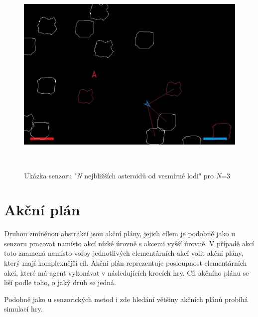 \begin{figure}[hp]

\includegraphics[width=150mm, height=100mm]{./Obrazky/N_nearest_asteroids.png}
\caption{Ukázka senzoru "\emph{N} nejbližších asteroidů od vesmírné lodi" pro \emph{N}=3}
\label{obr02:}
\end{figure}


\section{Akční plán}
Druhou zmíněnou abstrakcí jsou akční plány, jejich cílem je podobně jako u senzoru pracovat namísto akcí nízké úrovně s akcemi vyšší úrovně. V případě akcí toto znamená namísto volby jednotlivých elementárních akcí volit akční plány, který mají komplexnější cíl.
Akční plán reprezentuje posloupnost elementárních akcí, které má agent vykonávat v následujících krocích hry.
Cíl akčního plánu se liší podle toho, o jaký druh se jedná.
\par
Podobně jako u senzorických metod i zde hledání většiny akčních plánů probíhá simulací hry.


